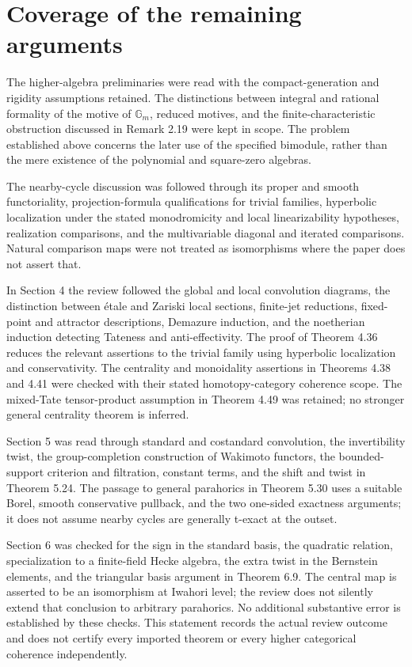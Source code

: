 \documentclass[10pt]{article}
\begin{document}
\section*{Coverage of the remaining arguments}
The higher-algebra preliminaries were read with the compact-generation and rigidity assumptions retained. The distinctions between integral and rational formality of the motive of \(\mathbb G_m\), reduced motives, and the finite-characteristic obstruction discussed in Remark 2.19 were kept in scope. The problem established above concerns the later use of the specified bimodule, rather than the mere existence of the polynomial and square-zero algebras.\par
The nearby-cycle discussion was followed through its proper and smooth functoriality, projection-formula qualifications for trivial families, hyperbolic localization under the stated monodromicity and local linearizability hypotheses, realization comparisons, and the multivariable diagonal and iterated comparisons. Natural comparison maps were not treated as isomorphisms where the paper does not assert that.\par
In Section 4 the review followed the global and local convolution diagrams, the distinction between étale and Zariski local sections, finite-jet reductions, fixed-point and attractor descriptions, Demazure induction, and the noetherian induction detecting Tateness and anti-effectivity. The proof of Theorem 4.36 reduces the relevant assertions to the trivial family using hyperbolic localization and conservativity. The centrality and monoidality assertions in Theorems 4.38 and 4.41 were checked with their stated homotopy-category coherence scope. The mixed-Tate tensor-product assumption in Theorem 4.49 was retained; no stronger general centrality theorem is inferred.\par
Section 5 was read through standard and costandard convolution, the invertibility twist, the group-completion construction of Wakimoto functors, the bounded-support criterion and filtration, constant terms, and the shift and twist in Theorem 5.24. The passage to general parahorics in Theorem 5.30 uses a suitable Borel, smooth conservative pullback, and the two one-sided exactness arguments; it does not assume nearby cycles are generally t-exact at the outset.\par
Section 6 was checked for the sign in the standard basis, the quadratic relation, specialization to a finite-field Hecke algebra, the extra twist in the Bernstein elements, and the triangular basis argument in Theorem 6.9. The central map is asserted to be an isomorphism at Iwahori level; the review does not silently extend that conclusion to arbitrary parahorics. No additional substantive error is established by these checks. This statement records the actual review outcome and does not certify every imported theorem or every higher categorical coherence independently.\par
\end{document}
